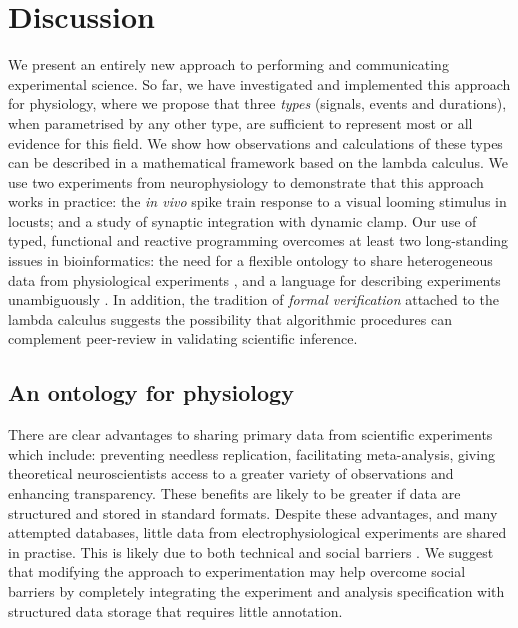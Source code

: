 \section*{Discussion}

We present an entirely new approach to performing and communicating
experimental science. So far, we have investigated and implemented this
approach for physiology, where we propose that three \emph{types} (signals,
events and durations), when parametrised by any other type, are
sufficient to represent most or all evidence for this field. We show
how observations and calculations of these types can be described in a
mathematical framework based on the lambda calculus. We use two
experiments from neurophysiology to demonstrate that this approach
works in practice: the \emph{in vivo} spike train response to a visual
looming stimulus in locusts; and a study of synaptic integration with
dynamic clamp. Our use of typed, functional and reactive programming
overcomes at least two long-standing issues in bioinformatics: the
need for a flexible ontology to share heterogeneous data from
physiological experiments \citep{Amari2002}, and a language for
describing experiments unambiguously \citep{Murray-Rust2002}. In
addition, the tradition of \emph{formal verification} attached to the
lambda calculus suggests the possibility that algorithmic procedures
can complement peer-review in validating scientific inference.

\subsection*{An ontology for physiology}

There are clear advantages to sharing primary data from scientific
experiments \citep{Insel2003} which include: preventing needless replication,
facilitating meta-analysis, giving theoretical neuroscientists access
to a greater variety of observations and enhancing transparency. These
benefits are likely to be greater if data are structured and stored in
standard formats. Despite these advantages, and many attempted
databases, little data from electrophysiological experiments are
shared in practise. This is likely due to both technical and social
barriers \citep{Amari2002}. We suggest that modifying the approach to
experimentation may help overcome social barriers by completely
integrating the experiment and analysis specification with structured
data storage that requires little annotation.


